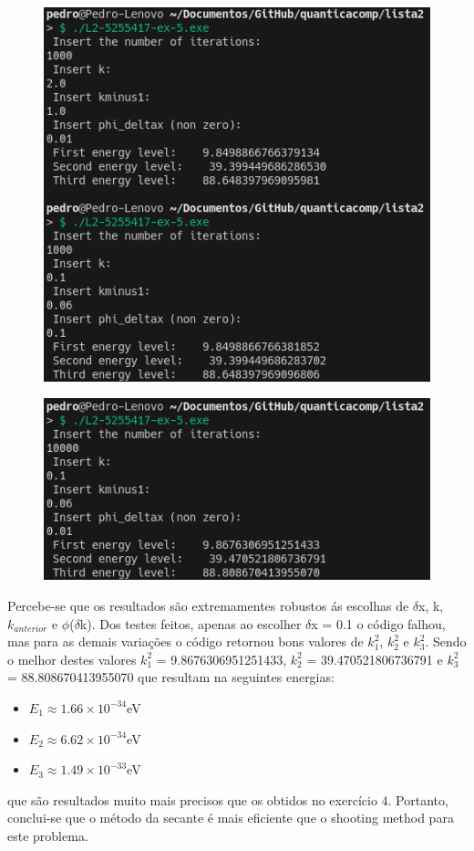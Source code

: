 \documentclass[12pt, a4paper]{article} %
\begin{document}
        \begin{figure}[H]    
            \centering
            \includegraphics[scale=0.8]{../images/results-ex5-3.png}
            \caption{}
        \end{figure}
        \begin{figure}[H]    
            \centering
            \includegraphics[scale=0.8]{../images/results-ex5-4.png}
            \caption{}
        \end{figure}

        Percebe-se que os resultados s\~ao extremamentes robustos \'{a}s escolhas de $\delta$x, k, $k_{anterior}$ e $\phi$($\delta$k). Dos testes feitos, apenas ao escolher $\delta$x = 0.1 o c\'odigo falhou, mas para as demais varia\c{c}\~oes o c\'odigo retornou bons valores de $k^{2}_{1}$, $k^{2}_{2}$ e $k^{2}_{3}$. Sendo o melhor destes valores $k^{2}_{1}$ = 9.8676306951251433, $k^{2}_{2}$ = 39.470521806736791 e $k^{2}_{3}$ = 88.808670413955070 que resultam na seguintes energias:
        \begin{itemize}
            \item $E_{1} \approx 1.66 \times 10^{-34}$eV
            \item $E_{2} \approx 6.62 \times 10^{-34}$eV
            \item $E_{3} \approx 1.49 \times 10^{-33}$eV
        \end{itemize}
        que s\~ao resultados muito mais precisos que os obtidos no exerc\'icio 4. Portanto, conclui-se que o m\'etodo da secante \'e mais eficiente que o shooting method para este problema.
        
        
\end{document}

